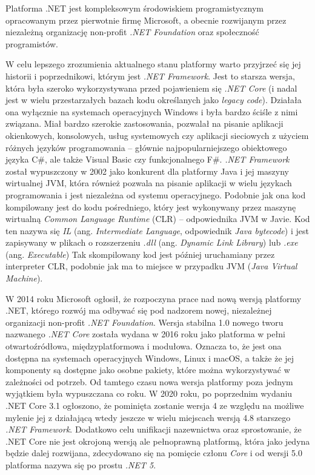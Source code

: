 Platforma .NET jest kompleksowym środowiskiem programistycznym opracowanym przez pierwotnie firmę Microsoft, a obecnie rozwijanym przez niezależną organizację non-profit \emph{.NET Foundation} oraz społeczność programistów.

W celu lepszego zrozumienia aktualnego stanu platformy warto przyjrzeć się jej historii i poprzednikowi, którym jest \emph{.NET Framework}.
Jest to starsza wersja, która była szeroko wykorzystywana przed pojawieniem się \emph{.NET Core} (i nadal jest w wielu przestarzałych bazach kodu określanych jako \emph{legacy code}).
Działała ona wyłącznie na systemach operacyjnych Windows i była bardzo ściśle z nimi związana.
Miał bardzo szerokie zastosowania, pozwalał na pisanie aplikacji okienkowych, konsolowych, usług systemowych czy aplikacji sieciowych z użyciem różnych języków programowania -- głównie najpopularniejszego obiektowego języka C\#, ale także Visual Basic czy funkcjonalnego F\#.
\emph{.NET Framework} został wypuszczony w 2002 jako konkurent dla platformy Java i jej maszyny wirtualnej JVM, która również pozwala na pisanie aplikacji w wielu językach programowania i jest niezależna od systemu operacyjnego.
Podobnie jak ona kod kompilowany jest do kodu pośredniego, który jest wykonywany przez maszynę wirtualną \emph{Common Language Runtime} (CLR) -- odpowiednika JVM w Javie.
Kod ten nazywa się \emph{IL} (ang. \emph{Intermediate Language}, odpowiednik \emph{Java bytecode}) i jest zapisywany w plikach o rozszerzeniu \emph{.dll} (ang. \emph{Dynamic Link Library}) lub \emph{.exe} (ang. \emph{Executable})
Tak skompilowany kod jest później uruchamiany przez interpreter CLR, podobnie jak ma to miejsce w przypadku JVM (\emph{Java Virtual Machine}).

W 2014 roku Microsoft ogłosił, że rozpoczyna prace nad nową wersją platformy .NET, którego rozwój ma odbywać się pod nadzorem nowej, niezależnej organizacji non-profit \emph{.NET Foundation}.
Wersja stabilna 1.0 nowego tworu nazwanego \emph{.NET Core} została wydana w 2016 roku jako platforma w pełni otwartoźródłowa, międzyplatformowa i modułowa.
Oznacza to, że jest ona dostępna na systemach operacyjnych Windows, Linux i macOS, a także że jej komponenty są dostępne jako osobne pakiety, które można wykorzystywać w zależności od potrzeb.
Od tamtego czasu nowa wersja platformy poza jednym wyjątkiem była wypuszczana co roku.
W 2020 roku, po poprzednim wydaniu .NET Core 3.1 ogłoszono, że pominięta zostanie wersja 4 ze względu na możliwe mylenie jej z działającą wtedy jeszcze w wielu miejscach wersją 4.8 starszego \emph{.NET Framework}.
Dodatkowo celu unifikacji nazewnictwa oraz sprostowanie, że .NET Core nie jest okrojoną wersją ale pełnoprawną platformą, która jako jedyna będzie dalej rozwijana, zdecydowano się na pomięcie członu \emph{Core} i od wersji 5.0 platforma nazywa się po prostu \emph{.NET 5}.

